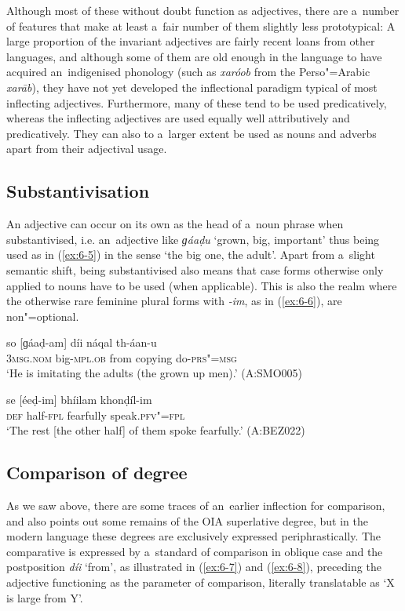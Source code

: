 Although most of these without doubt function as adjectives, there are a~number of features that make at least a~fair number of them slightly less prototypical: A large proportion of the invariant adjectives are fairly recent loans from other languages, and although some of them are old enough in the language to have acquired an~indigenised phonology (such as \textit{xaróob} from the Perso"=Arabic \textit{xarāb}), they have not yet developed the inflectional paradigm typical of most inflecting adjectives. Furthermore, many of these tend to be used predicatively, whereas the inflecting adjectives are used equally well attributively and predicatively. They can also to a~larger extent be used as nouns and adverbs apart from their adjectival usage.


\subsection{Substantivisation}
\label{subsec:6-3-2}

An adjective can occur on its own as the head of a~noun phrase when substantivised, i.e. an~adjective like \textit{ɡáaḍu} `grown, big, important' thus being used as in (\ref{ex:6-5}) in the sense `the big one, the adult'. Apart from a~slight semantic shift, being substantivised also means that case forms otherwise only applied to nouns have to be used (when applicable). This is also the realm where the otherwise rare feminine plural forms with \textit{-im}, as in (\ref{ex:6-6}), are non"=optional.

\begin{exe}
\ex
\label{ex:6-5}
\gll so [ɡáaḍ-am] díi náqal th-áan-u \\
\textsc{3msg.nom} big-\textsc{mpl.ob} from copying do-\textsc{prs"=msg} \\
\glt `He is imitating the adults (the grown up men).' (A:SMO005)

\ex
\label{ex:6-6}
\gll se [éeḍ-im] bhíilam khonḍíl-im \\
\textsc{def} half-\textsc{fpl} fearfully speak.\textsc{pfv"=fpl} \\
\glt `The rest [the other half] of them spoke fearfully.' (A:BEZ022)
\end{exe}

\subsection{Comparison of degree}
\label{subsec:6-3-3}

As we saw above, there are some traces of an~earlier inflection for comparison, and \citet[17]{morgenstierne1941} also points out some remains of the OIA superlative degree, but in the modern language these degrees are exclusively expressed periphrastically. The comparative is expressed by a~standard of comparison in oblique case and the postposition \textit{díi} `from', as illustrated in (\ref{ex:6-7}) and (\ref{ex:6-8}), preceding the adjective functioning as the parameter of comparison, literally translatable as `X is large from Y'. 

